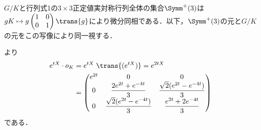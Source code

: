 \begin{npfwn}
  $G/K$と行列式1の$3\times 3$正定値実対称行列全体の集合$\Symm^{+}(3)$は$gK \mapsto g
  \begin{pmatrix}
    1 & 0\\ 0 & 1
  \end{pmatrix}
  \trans{g} $により微分同相である．以下，$\Symm^{+}(3) $の元と$G/K $の元をこの写像により同一視する．
  
  より
  \begin{align}
    e^{tX}\cdot o_K &= e^{tX}\; \trans{(e^{tX})} = e^{2tX}\notag\\
                    &= \begin{pmatrix}
                      e^{2t} & 0 & 0 \\
                      0 & \dfrac{2e^{2t} + e^{-4t}}{3} &  \dfrac{\sqrt{2} (e^{2t} - e^{-4t})}{3}\\
                      0 & \dfrac{\sqrt{2} (e^{2t} - e^{-4t})}{3} & \dfrac{e^{2t} + 2e^{-4t}}{3}
                    \end{pmatrix}\label{eq:0114-1}
  \end{align}
  である．


\end{npfwn}
